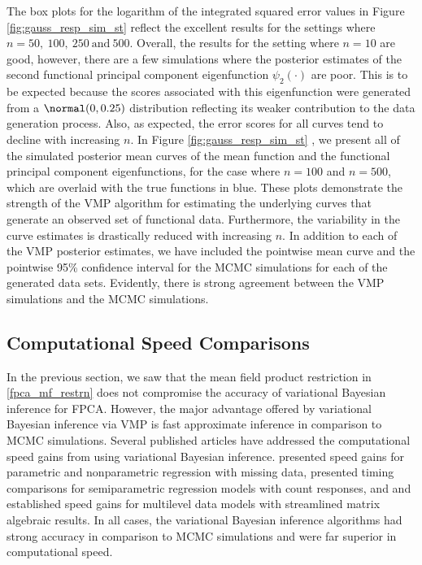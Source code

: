 \documentclass[12pt]{article}
\theoremstyle{plain}
\theoremstyle{definition}
\theoremstyle{remark}
\begin{document}
The box plots for the logarithm of the integrated squared error values
in Figure \ref{fig:gauss_resp_sim_st}  reflect the excellent results for the
settings where $n = 50, \ 100, \ 250 \ \text{and} \ 500$.
Overall, the results for the setting where $n = 10$ are good, however,
there are a few simulations where the posterior estimates of the second functional principal component
eigenfunction $\psi_2 (\cdot)$ are poor. This is to be expected because the scores
associated with this eigenfunction were generated from a $\normal (0, 0.25)$ distribution reflecting its weaker
contribution to the data generation process. Also, as expected, the error scores for all curves tend to decline with
increasing $n$. In Figure \ref{fig:gauss_resp_sim_st} , we present all of the simulated
posterior mean curves of
the mean function and the functional principal component eigenfunctions, for the case where $n = 100$
and $n = 500$, which are
overlaid with the true functions in blue. These plots demonstrate the strength of the VMP algorithm for estimating
the underlying curves that generate an observed set of functional data. Furthermore, the variability in the curve
estimates is drastically reduced with increasing $n$. In addition to each of the VMP posterior
estimates, we have included the pointwise mean curve and the pointwise 95\% confidence interval for the MCMC
simulations for each of the generated data sets. Evidently, there is strong agreement between the VMP simulations
and the MCMC simulations.


\subsection{Computational Speed Comparisons}
\label{sec:speed_comp}

In the previous section, we saw that the mean field product restriction in \eqref{fpca_mf_restrn} does not
compromise the accuracy of variational Bayesian inference for FPCA. However,
the major advantage offered by variational Bayesian inference via VMP is fast approximate inference in 
comparison to MCMC simulations. Several published articles have addressed the computational speed gains
from using variational Bayesian inference.  presented speed gains for parametric and nonparametric
regression with missing data,  presented timing comparisons for semiparametric regression
models with count responses, and
 and  established speed gains for multilevel data models
with streamlined matrix algebraic results.
In all cases, the variational Bayesian inference algorithms had strong accuracy in
comparison to MCMC simulations and were far superior in computational speed.
\end{document}
